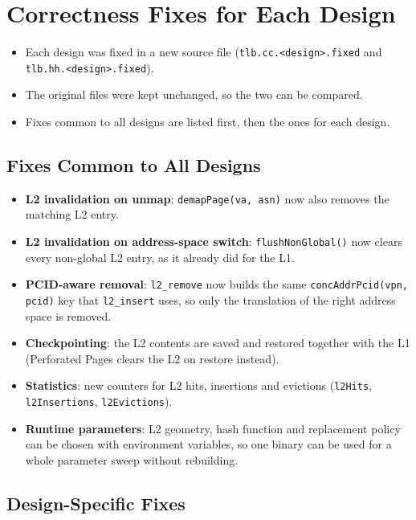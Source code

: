 \section{Correctness Fixes for Each Design}
\label{sec:fixes}

\begin{itemize}
    \item Each design was fixed in a new source file (\texttt{tlb.cc.<design>.fixed} and \texttt{tlb.hh.<design>.fixed}).
    \item The original files were kept unchanged, so the two can be compared.
    \item Fixes common to all designs are listed first, then the ones for each design.
\end{itemize}

\subsection{Fixes Common to All Designs}
\begin{itemize}
    \item \textbf{L2 invalidation on unmap}: \texttt{demapPage(va, asn)} now also removes the matching L2 entry.
    \item \textbf{L2 invalidation on address-space switch}: \texttt{flushNonGlobal()} now clears every non-global L2 entry, as it already did for the L1.
    \item \textbf{PCID-aware removal}: \texttt{l2\_remove} now builds the same \texttt{concAddrPcid(vpn, pcid)} key that \texttt{l2\_insert} uses, so only the translation of the right address space is removed.
    \item \textbf{Checkpointing}: the L2 contents are saved and restored together with the L1 (Perforated Pages clears the L2 on restore instead).
    \item \textbf{Statistics}: new counters for L2 hits, insertions and evictions (\texttt{l2Hits}, \texttt{l2Insertions}, \texttt{l2Evictions}).
    \item \textbf{Runtime parameters}: L2 geometry, hash function and replacement policy can be chosen with environment variables, so one binary can be used for a whole parameter sweep without rebuilding.
\end{itemize}

\subsection{Design-Specific Fixes}

